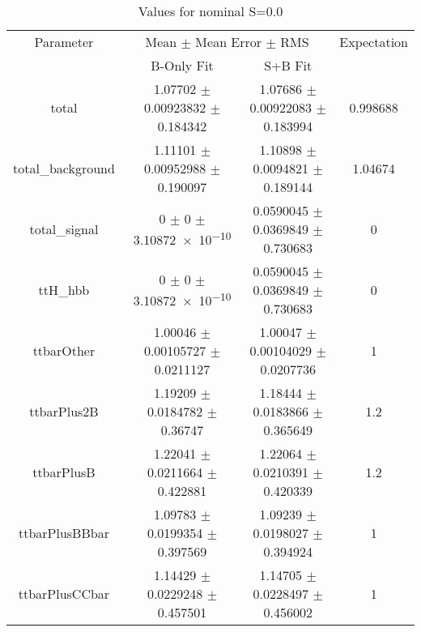 \begin{table}
\centering
\caption{Values for nominal S=0.0}
\begin{tabular}{cccc}
\toprule
Parameter & \multicolumn{2}{c}{Mean $\pm$ Mean Error $\pm$ RMS} & Expectation\\
 & B-Only Fit & S+B Fit & \\
\midrule
total & \num{1.07702} $\pm$ \num{0.00923832} $\pm$ \num{0.184342} & \num{1.07686} $\pm$ \num{0.00922083} $\pm$ \num{0.183994} & \num{0.998688}\\
total\_background & \num{1.11101} $\pm$ \num{0.00952988} $\pm$ \num{0.190097} & \num{1.10898} $\pm$ \num{0.0094821} $\pm$ \num{0.189144} & \num{1.04674}\\
total\_signal & \num{0} $\pm$ \num{0} $\pm$ \num{3.10872e-10} & \num{0.0590045} $\pm$ \num{0.0369849} $\pm$ \num{0.730683} & \num{0}\\
ttH\_hbb & \num{0} $\pm$ \num{0} $\pm$ \num{3.10872e-10} & \num{0.0590045} $\pm$ \num{0.0369849} $\pm$ \num{0.730683} & \num{0}\\
ttbarOther & \num{1.00046} $\pm$ \num{0.00105727} $\pm$ \num{0.0211127} & \num{1.00047} $\pm$ \num{0.00104029} $\pm$ \num{0.0207736} & \num{1}\\
ttbarPlus2B & \num{1.19209} $\pm$ \num{0.0184782} $\pm$ \num{0.36747} & \num{1.18444} $\pm$ \num{0.0183866} $\pm$ \num{0.365649} & \num{1.2}\\
ttbarPlusB & \num{1.22041} $\pm$ \num{0.0211664} $\pm$ \num{0.422881} & \num{1.22064} $\pm$ \num{0.0210391} $\pm$ \num{0.420339} & \num{1.2}\\
ttbarPlusBBbar & \num{1.09783} $\pm$ \num{0.0199354} $\pm$ \num{0.397569} & \num{1.09239} $\pm$ \num{0.0198027} $\pm$ \num{0.394924} & \num{1}\\
ttbarPlusCCbar & \num{1.14429} $\pm$ \num{0.0229248} $\pm$ \num{0.457501} & \num{1.14705} $\pm$ \num{0.0228497} $\pm$ \num{0.456002} & \num{1}\\
\bottomrule
\end{tabular}
\end{table}